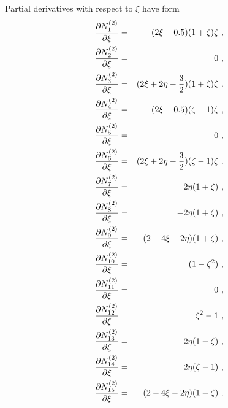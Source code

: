 Partial derivatives with respect to $\xi$ have form
\begin{eqnarray}
\label{bfquadweddx1}
\ppd{N_1^{(2)}}{\xi} &=& (2 \xi - 0.5) (1 + \zeta)\zeta\ ,
\\
\label{bfquadweddx2}
\ppd{N_2^{(2)}}{\xi} &=& 0\ ,
\\
\label{bfquadweddx3}
\ppd{N_3^{(2)}}{\xi} &=& (2\xi + 2\eta - \del{3}{2})(1 + \zeta)\zeta\ .
\\
\label{bfquadweddx4}
\ppd{N_4^{(2)}}{\xi} &=& (2\xi-0.5)(\zeta - 1)\zeta\ ,
\\
\label{bfquadweddx5}
\ppd{N_5^{(2)}}{\xi} &=& 0\ ,
\\
\label{bfquadweddx6}
\ppd{N_6^{(2)}}{\xi} &=& (2 \xi + 2\eta -\del{3}{2})(\zeta-1)\zeta\ .
\\
\label{bfquadweddx7}
\ppd{N_7^{(2)}}{\xi} &=& 2 \eta (1 + \zeta)\ ,
\\
\label{bfquadweddx8}
\ppd{N_8^{(2)}}{\xi} &=& - 2 \eta (1 + \zeta)\ ,
\\
\label{bfquadweddx9}
\ppd{N_9^{(2)}}{\xi} &=& (2 - 4\xi - 2\eta)(1 + \zeta)\ ,
\\
\label{bfquadweddx10}
\ppd{N_{10}^{(2)}}{\xi} &=& (1 - \zeta^2)\ ,
\\
\label{bfquadweddx11}
\ppd{N_{11}^{(2)}}{\xi} &=& 0\ ,
\\
\label{bfquadweddx12}
\ppd{N_{12}^{(2)}}{\xi} &=& \zeta^2 - 1\ ,
\\
\label{bfquadweddx13}
\ppd{N_{13}^{(2)}}{\xi} &=& 2 \eta (1 - \zeta)\ ,
\\
\label{bfquadweddx14}
\ppd{N_{14}^{(2)}}{\xi} &=& 2 \eta (\zeta - 1)\ ,
\\
\label{bfquadweddx15}
\ppd{N_{15}^{(2)}}{\xi} &=& (2 - 4\xi - 2\eta)(1 - \zeta)\ .
\end{eqnarray}



